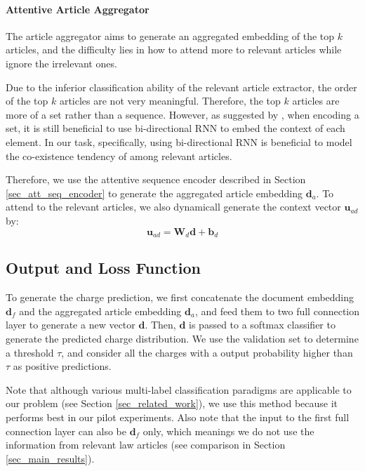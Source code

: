 \paragraph{Attentive Article Aggregator}
The article aggregator aims to generate an aggregated embedding of the top $k$ articles, and the difficulty lies in how to attend more to relevant articles while ignore the irrelevant ones. 

Due to the inferior classification ability of the relevant article extractor, the order of the top $k$ articles are not very meaningful. Therefore, the top $k$ articles are more of a set rather than a sequence. However, as suggested by \cite{vinyals2016matching}, when encoding a set, it is still beneficial to use bi-directional RNN to embed the context of each element.
In our task, specifically, using bi-directional RNN is beneficial to model the co-existence tendency of among relevant articles.

Therefore, we use the attentive sequence encoder described in Section \ref{sec_att_seq_encoder} to generate the aggregated article embedding $\mathbf{d}_a$. To attend to the relevant articles, we also dynamicall generate the context vector $\mathbf{u}_{ad}$ by:
\begin{equation}
\mathbf{u}_{ad} = \mathbf{W}_d \mathbf{d} + \mathbf{b}_d
\end{equation}


\subsection{Output and Loss Function}
To generate the charge prediction, we first concatenate the document embedding $\mathbf{d}_f$ and the aggregated article embedding $\mathbf{d}_a$, and feed them to two full connection layer to generate a new vector $\mathbf{d}$. Then, $\mathbf{d}$ is passed to a softmax classifier to generate the predicted charge distribution. We use the validation set to determine a threshold $\tau$, and consider all the charges with a output probability higher than $\tau$ as positive predictions.

Note that although various multi-label classification paradigms are applicable to our problem (see Section \ref{sec_related_work}), we use this method because it performs best in our pilot experiments. Also note that the input to the first full connection layer can also be $\mathbf{d}_f$ only, which meanings we do not use the information from relevant law articles (see comparison in Section \ref{sec_main_results}). 

